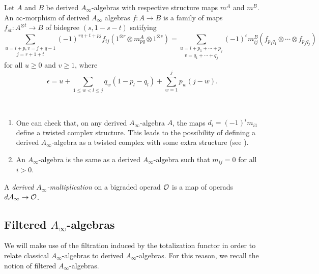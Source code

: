 \documentclass[join.tex]{subfiles}
\begin{document}
\begin{defin}
Let $A$ and $B$ be derived $A_\infty$-algebras with respective structure maps $m^A$ and $m^B$. An $\infty$-morphism of derived $A_\infty$ algebras $f:A\to B$ is a family of maps $f_{st}:A^{\otimes t}\to B$ of bidegree $(s,1-s-t)$ satifying
\begin{equation}\label{dinftymaps}
\underset{j=r+1+t}{\sum_{u=i+p, v=j+q-1}}(-1)^{rq+t+pj}f_{ij}(1^{\otimes r}\otimes m_{pq}^A\otimes 1^{\otimes s})=\underset{v=q_1+\cdots +q_j}{\sum_{u=i+p_1+\cdots +p_j}}(-1)^{\epsilon} m^B_{ij}(f_{p_1 q_1}\otimes\cdots\otimes f_{p_j q_j})
\end{equation}
for all $u\geq 0$ and $v\geq 1$, where
\[\epsilon = u + \sum_{1\leq w < l \leq j} q_w(1-p_l-q_l)  + \sum_{w=1}^j p_w(j-w).\]
\end{defin}
\begin{ex}\
\begin{enumerate}
\item One can check that, on any derived $A_\infty$-algebra $A$, the maps $d_i=(-1)^{i}m_{i1}$ define a twisted complex structure. This leads to the possibility of defining a derived $A_\infty$-algebra as a twisted complex with some extra structure (see ).
\item An $A_\infty$-algebra is the same as a derived $A_\infty$-algebra such that $m_{ij}=0$ for all $i>0$.
\end{enumerate}
\end{ex}




\begin{defin}\label{derivedmultiplication}
A \emph{derived $A_\infty$-multiplication} on a bigraded operad ${\mathcal O}$ is a map of operads $d\mathcal{A}_\infty\to{\mathcal O}$.
\end{defin}

\subsection{Filtered $A_\infty$-algebras}

We will make use of the filtration induced by the totalization functor in order to relate classical $A_\infty$-algebras to derived $A_\infty$-algebras. For this reason, we recall the notion of filtered $A_\infty$-algebras.
\end{document}
